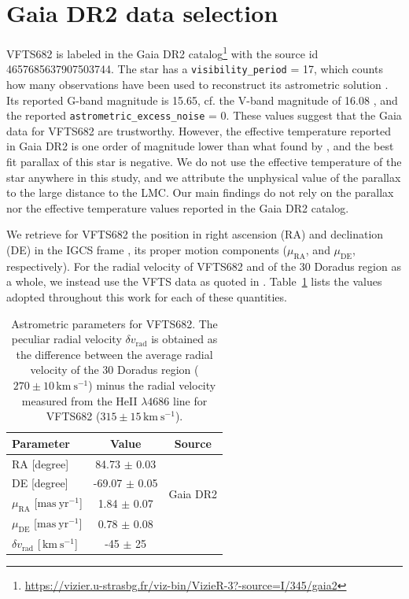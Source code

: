 \documentclass{aa}
\newcommand{\kms}{{\,\mathrm{km\ s^{-1}}}}
\DeclareRobustCommand{\Tabref}[1]{Table~\ref{#1}}
\begin{document}
\section{Gaia DR2 data selection}
\label{sec:sample}

VFTS682 is labeled in the Gaia DR2
catalog\footnote{\url{https://vizier.u-strasbg.fr/viz-bin/VizieR-3?-source=I/345/gaia2}} with the
source id 4657685637907503744. The star has a
\texttt{visibility\_period} = 17, which counts how many observations have
been used to reconstruct its astrometric solution
\citep[][]{lindengren:18}. Its reported G-band
magnitude is 15.65, cf. the V-band magnitude of 16.08
\citep[][]{evans:11, bestenlehner:11}, and the reported
\texttt{astrometric\_excess\_noise} = 0. These values suggest that the Gaia
data for VFTS682 are trustworthy. However, the effective temperature
reported in Gaia DR2 is one order of magnitude lower than what found by
\cite{bestenlehner:11}, and the best fit parallax of this star is
negative. We do not use the effective temperature of the star anywhere
in this study, and we attribute the unphysical value of the parallax
to the large distance to the LMC. Our main findings do not rely on the
parallax nor the effective temperature values reported in the Gaia DR2
catalog.


We retrieve for VFTS682 the position in right ascension (RA) and declination (DE)
in the IGCS frame \cite[][]{brown:18}, its
proper motion components ($\mu_\mathrm{RA}$, and $\mu_\mathrm{DE}$,
respectively). For the radial velocity of VFTS682 and of the 30 Doradus
region as a whole, we instead use the VFTS data
as quoted in \cite{bestenlehner:11}. \Tabref{tab:vfts682} lists the values adopted throughout
this work for each of these quantities.

\begin{table}[tbp]
  \centering
    \caption{Astrometric parameters for VFTS682. The peculiar radial
    velocity $\delta v_\mathrm{rad}$ is obtained as the difference
    between the average radial velocity of the 30 Doradus region
    ($270\pm10\kms$) minus the radial velocity measured from the HeII $\lambda4686$
    line for VFTS682 ($315\pm15\kms$).}

  \begin{tabular}[htbp]{l|c|c}
    Parameter & Value & Source\\ \hline\hline
    RA \hfill[degree] &  \phantom{-}84.73 $\pm$  0.03 & \multirow{4}{*}{Gaia DR2}\\
    DE \hfill [degree] & -69.07 $\pm$  0.05  & \\
    $\mu_\mathrm{RA}$  \hfill[$\mathrm{mas\ yr^{-1}}$] & \phantom{-0}1.84 $\pm$ 0.07 & \\
    $\mu_\mathrm{DE}$  \hfill[$\mathrm{mas\ yr^{-1}}$] & \phantom{-0}0.78 $\pm$ 0.08& \\
    $\delta v_\mathrm{rad}$  \hfill[$\kms$] & \phantom{0}-45 $\pm$ 25 & \cite{bestenlehner:11}\\
    \hline
  \end{tabular}
  \label{tab:vfts682}
\end{table}
\end{document}
